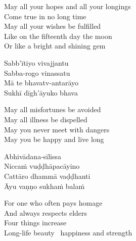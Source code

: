 \begin{english-verses}
  May all your hopes and all your longings\\
  Come true in no long time\\
  May all your wishes be fulfilled\\
  Like on the fifteenth day the moon\\
  Or like a bright and shining gem
\end{english-verses}


\begin{pali-hang-continued}
  Sabb'ītiyo vivajjantu\hyperlink{endnote120-appendix}{\hypertarget{endnote120-body}{}}\\
  Sabba-rogo vinassatu\\
  Mā te bhavatv-antarāyo\\
  Sukhī dīgh'āyuko bhava
\end{pali-hang-continued}

\begin{english-verses}
  May all misfortunes be avoided\\
  May all illness be dispelled\\
  May you never meet with dangers\\
  May you be happy and live long
\end{english-verses}

\suttaRef{[Khp A]}

\begin{pali-hang-continued}
  Abhivādana-sīlissa\\
  Niccaṁ vuḍḍhāpacāyino\\
  Cattāro dhammā vaḍḍhanti\\
  Āyu vaṇṇo sukhaṁ balaṁ\hyperlink{endnote121-appendix}{\hypertarget{endnote121-body}{}}
\end{pali-hang-continued}

\begin{english-verses}
  For one who often pays homage\\
  And always respects elders\\
  Four things increase\\
  Long-life beauty \breathmark\ happiness and strength
\end{english-verses}

